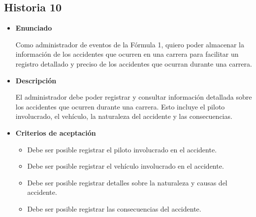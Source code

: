 \documentclass{article}
\begin{document}
	\subsection{Historia 10}
	\begin{itemize}
		
		\item \large{\textbf{Enunciado}}
		\begin{description}
Como administrador de eventos de la Fórmula 1, quiero poder almacenar la información de los accidentes que ocurren en una carrera para facilitar un registro detallado y preciso de los accidentes que ocurran durante una carrera.
		\end{description}
		
		\item \large{\textbf{Descripción}}
		\begin{description}
El administrador debe poder registrar y consultar información detallada sobre los accidentes que ocurren durante una carrera. Esto incluye el piloto involucrado, el vehículo, la naturaleza del accidente y las consecuencias. 

		\end{description}
		
		\item \large{\textbf{Criterios de aceptación}}
		\begin{itemize}
			\item Debe ser posible registrar el piloto involucrado en el accidente.
			\item Debe ser posible registrar el vehículo involucrado en el accidente. 
			\item Debe ser posible registrar detalles sobre la naturaleza y causas del accidente. 
			\item Debe ser posible registrar las consecuencias del accidente.
			
		\end{itemize}
		
	\end{itemize}
	
\end{document}
